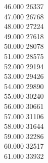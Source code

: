 { 46.000	26337 \\
 47.000	26768 \\
 48.000	27224 \\
 49.000	27618 \\
 50.000	28078 \\
 51.000	28575 \\
 52.000	29194 \\
 53.000	29426 \\
 54.000	29890 \\
 55.000	30240 \\
 56.000	30661 \\
 57.000	31106 \\
 58.000	31644 \\
 59.000	32286 \\
 60.000	32517 \\
 61.000	33932 \\
}
